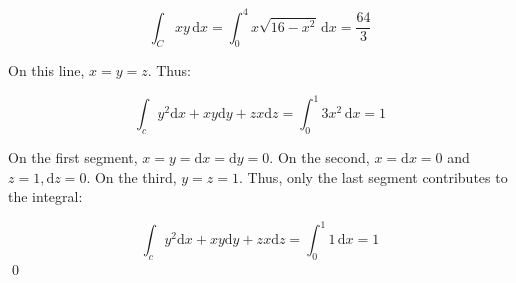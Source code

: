 \documentclass[12pt]{article}
\begin{document}
\begin{correction}
    \begin{equation}
        \int_{C} xy \, \mathrm{d}x = \int_{0}^{4} x\sqrt{16 - x^{2}} \, \mathrm{d}x = \frac{64}{3}
    \end{equation}
\end{correction}


On this line, $x = y = z$. Thus:

\begin{equation}
    \int_{c} y^{2} \mathrm{d}x  + xy \mathrm{d}y + zx \mathrm{d}z = \int_{0}^{1} 3x^{2} \, \mathrm{d}x = 1
\end{equation}

On the first segment, $x = y = \mathrm{d}x = \mathrm{d}y =  0$. On the second, $x = \mathrm{d}x = 0$ and $z = 1, \mathrm{d}z = 0$. On the third, $y = z = 1$. Thus, only the last segment contributes to the integral:

\begin{equation}
    \int_{c} y^{2} \mathrm{d}x  + xy \mathrm{d}y + zx \mathrm{d}z = \int_{0}^{1} 1 \, \mathrm{d}x = 1
\end{equation}
\qed
\end{document}
